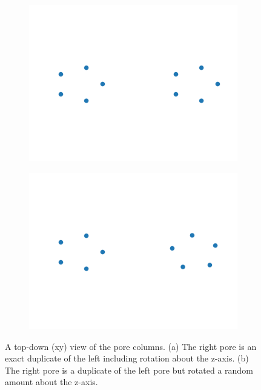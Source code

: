\documentclass{article}
\begin{document}
  \begin{figure}[!htb]
  \centering
  \begin{subfigure}{0.45\textwidth}
  \includegraphics[width=\textwidth]{same_rotation.png}
  \caption{}\label{fig:same_rotation}
  \end{subfigure}
  \begin{subfigure}{0.45\textwidth}
  \includegraphics[width=\textwidth]{different_rotation.png}
  \caption{}\label{fig:different_rotation}
  \end{subfigure}
  \caption{A top-down (xy) view of the pore columns. (a) The right pore is an
  exact duplicate of the left including rotation about the z-axis. (b) The right
  pore is a duplicate of the left pore but rotated a random amount about the 
  z-axis.}\label{fig:initial_rotations}
  \end{figure}
\end{document}
